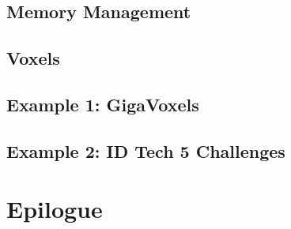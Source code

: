 \section{Memory Management}


\section{Voxels}

\section{Example 1: GigaVoxels}


\section{Example 2: ID Tech 5 Challenges}

\chapter{Epilogue}
\label{ch:Epilogue}